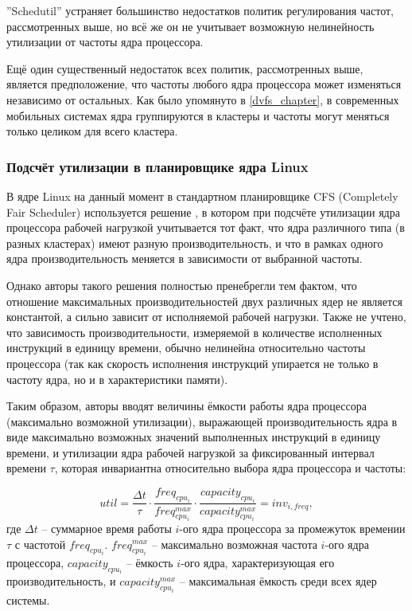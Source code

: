     ''Schedutil'' устраняет большинство недостатков политик регулирования частот, рассмотренных выше,
    но всё же он не учитывает возможную нелинейность утилизации от частоты ядра процессора.

    Ещё один существенный недостаток всех политик, рассмотренных выше, является предположение,
    что частоты любого ядра процессора может изменяться независимо от остальных.
    Как было упомянуто в \ref{dvfs_chapter}, в современных мобильных системах ядра группируются
    в кластеры и частоты могут меняться только целиком для всего кластера.

\subsubsection{Подсчёт утилизации в планировщике ядра Linux}

    В ядре Linux на данный момент в стандартном планировщике CFS (Completely Fair Scheduler)
    используется решение \cite{KernelDocsCapacity}, в котором при подсчёте утилизации ядра
    процессора рабочей нагрузкой учитывается тот факт, что ядра различного типа
    (в разных кластерах) имеют разную производительность, и что в рамках одного ядра
    производительность меняется в зависимости от выбранной частоты.

    Однако авторы такого решения полностью пренебрегли тем фактом, что отношение максимальных
    производительностей двух различных ядер не является константой, а сильно зависит от
    исполняемой рабочей нагрузки. Также не учтено, что зависимость производительности, измеряемой
    в количестве исполненных инструкций в единицу времени, обычно нелинейна относительно частоты процессора
    (так как скорость исполнения инструкций упирается не только в частоту ядра, но и в характеристики
    памяти).

    Таким образом, авторы вводят величины ёмкости работы ядра процессора (максимально возможной утилизации),
    выражающей производительность ядра в виде максимально возможных значений выполненных инструкций в
    единицу времени, и утилизации ядра рабочей нагрузкой за фиксированный интервал времени $\tau$,
    которая инвариантна относительно выбора ядра процессора и частоты:

    \begin{equation}
        util = \frac{\Delta t}{\tau} \cdot \frac{freq_{cpu_{i}}}{freq^{max}_{cpu_{i}}} \cdot
               \frac{capacity_{cpu_{i}}}{capacity^{max}_{cpu_{i}}} =
            inv_{i, freq},
    \end{equation}
    где $\Delta t$ -- суммарное время работы $i$-ого ядра процессора за промежуток времении $\tau$ с
    частотой $freq_{cpu_{i}}$. $freq^{max}_{cpu_{i}}$ -- максимально возможная частота $i$-ого ядра
    процессора, $capacity_{cpu_{i}}$ -- ёмкость $i$-ого ядра, характеризующая его производительность,
    и $capacity^{max}_{cpu_{i}}$ -- максимальная ёмкость среди всех ядер системы.

